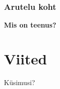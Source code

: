 \begin{frame}[fragile]
  \frametitle{Arutelu koht}
		\begin{center}
			\textbf{Mis on teenus?}
		\end{center}
\end{frame}


\section{Viited}

\begin{frame}[t,allowframebreaks,]
  	
	 

\end{frame}

\begin{frame}[plain]
	\begin{center}Küsimusi?\end{center}
\end{frame}


